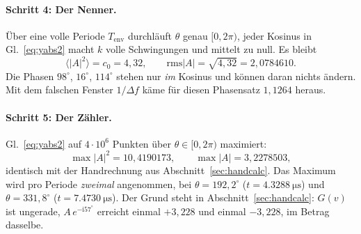 \documentclass[11pt,a4paper]{article}
\begin{document}
\paragraph{Schritt 4: Der Nenner.}
Über eine volle Periode $T_\mathrm{env}$ durchläuft $\theta$ genau
$[0,2\pi)$, jeder Kosinus in Gl.~\eqref{eq:yabs2} macht $k$ volle
Schwingungen und mittelt zu null. Es bleibt
\begin{equation}
  \langle|A|^2\rangle = c_0 = 4{,}32,
  \qquad
  \mathrm{rms}|A| = \sqrt{4{,}32} = 2{,}0784610 .
\end{equation}
Die Phasen $98^\circ$, $16^\circ$, $114^\circ$ stehen nur \emph{im}
Kosinus und können daran nichts ändern. Mit dem falschen Fenster $1/\Delta f$
käme für diesen Phasensatz $1{,}1264$ heraus.

\paragraph{Schritt 5: Der Zähler.}
Gl.~\eqref{eq:yabs2} auf $4\cdot10^6$ Punkten über $\theta\in[0,2\pi)$
maximiert:
\begin{equation}
  \max|A|^2 = 10{,}4190173 ,\qquad \max|A| = 3{,}2278503 ,
\end{equation}
identisch mit der Handrechnung aus Abschnitt~\ref{sec:handcalc}. Das Maximum
wird pro Periode \emph{zweimal} angenommen, bei $\theta = 192{,}2^\circ$
($t=\SI{4.3288}{\micro\second}$) und $\theta = 331{,}8^\circ$
($t=\SI{7.4730}{\micro\second}$). Der Grund steht in
Abschnitt~\ref{sec:handcalc}: $G(v)$ ist ungerade, $A\,e^{-\mathrm{i}57^\circ}$
erreicht einmal $+3{,}228$ und einmal $-3{,}228$, im Betrag dasselbe.
\end{document}
